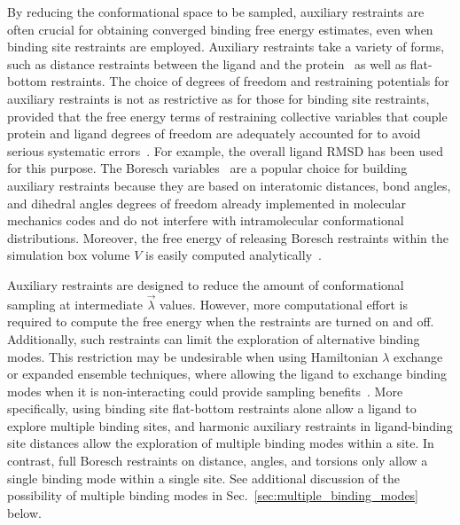 \documentclass[9pt,bestpractices]{livecoms}
\begin{document}
By reducing the conformational space to be sampled, auxiliary restraints are often crucial for obtaining converged binding free energy estimates, even when binding site restraints are employed.
Auxiliary restraints take a variety of forms, such as distance restraints between the ligand and the protein~\cite{mobley2006use,clark2023comparison} as well as flat-bottom restraints. The choice of degrees of freedom and restraining potentials for auxiliary restraints is not as restrictive as for those for binding site restraints, provided that the free energy terms of restraining collective variables that couple protein and ligand degrees of freedom are adequately accounted for to avoid serious systematic errors~\cite{clark2023comparison}.
For example, the overall ligand RMSD has been used~\cite{woo2005calculation} for this purpose.
The Boresch variables~\cite{boresch2003absolute,baumann2023broadening} are a popular choice for building auxiliary restraints because they are based on interatomic distances, bond angles, and dihedral angles degrees of freedom already implemented in molecular mechanics codes and do not interfere with intramolecular conformational distributions. Moreover, the free energy of releasing Boresch restraints within the simulation box volume $V$ is easily computed analytically~\cite{boresch2003absolute, boresch2024analytical}.

Auxiliary restraints are designed to reduce the amount of conformational sampling at intermediate $\vec{\lambda}$ values. However, more computational effort is required to compute the free energy when the restraints are turned on and off. Additionally, such restraints can limit the exploration of alternative binding modes. This restriction may be undesirable when using Hamiltonian $\lambda$ exchange or expanded ensemble techniques, where allowing the ligand to exchange binding modes when it is non-interacting could provide sampling benefits~\cite{wang2013identifying}.
More specifically, using binding site flat-bottom restraints alone allow a ligand to explore multiple binding sites, and harmonic auxiliary restraints in ligand-binding site distances allow the exploration of multiple binding modes within a site. In contrast, full Boresch restraints on distance, angles, and torsions only allow a single binding mode within a single site.
See additional discussion of the possibility of multiple binding modes in Sec.~\ref{sec:multiple_binding_modes} below.
\end{document}
